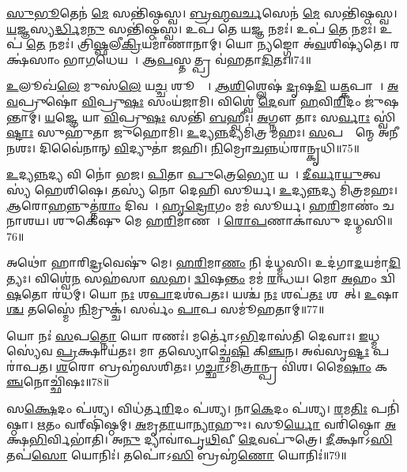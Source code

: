 \ul{𑌸𑍁}\ul{𑌭𑍂}𑌤𑍇𑌨॑ \ul{𑌮𑍇} 𑌸𑌨𑍍𑌤𑌿॑𑌷𑍍𑌠𑌸𑍍𑌵।
\ul{𑌬𑍍𑌰}\ul{𑌹𑍍𑌮}\ul{𑌵}\ul{𑌰𑍍𑌚}𑌸𑍇𑌨॑ \ul{𑌮𑍇} 𑌸𑌨𑍍𑌤𑌿॑𑌷𑍍𑌠𑌸𑍍𑌵।
\ul{𑌯}𑌜𑍍𑌞𑌸𑍍𑌯\ul{𑌰𑍍𑌦𑍍𑌧𑌿}𑌮\ul{𑌨𑍁} 𑌸𑌨𑍍𑌤𑌿॑𑌷𑍍𑌠𑌸𑍍𑌵।
𑌉𑌪॑ 𑌤𑍇 𑌯\ul{𑌜𑍍𑌞} 𑌨𑌮𑌃॑।
𑌉𑌪॑ \ul{𑌤𑍇} 𑌨𑌮𑌃॑।
𑌉𑌪॑ \ul{𑌤𑍇} 𑌨𑌮𑌃॑।
𑌤𑍍𑌰𑌿\ul{𑌷𑍍𑌫}𑌲𑍀\ul{𑌕𑍍𑌰𑌿}𑌯𑌮𑌾॑𑌣𑌾𑌨𑌾𑌮𑍍।
𑌯𑍋 \ul{𑌨𑍍𑌯}𑌙𑍍𑌗𑍋 𑌅॑\ul{𑌵}𑌶𑌿𑌷𑍍𑌯॑𑌤𑍇।
𑌰𑌕𑍍𑌷॑𑌸𑌾𑌂 𑌭𑌾\ul{𑌗}𑌧𑍇𑌯𑌮𑍍᳚।
𑌆\ul{𑌪}𑌸𑍍𑌤𑌤𑍍𑌪𑍍𑌰 𑌵॑𑌹𑌤𑌾\ul{𑌦𑌿}𑌤𑌃॥74॥

\ul{𑌉}𑌲𑍂𑌖॑\ul{𑌲𑍇} 𑌮𑍁𑌸॑\ul{𑌲𑍇} 𑌯\ul{𑌚𑍍𑌚} 𑌶𑍂𑌰𑍍𑌪𑍇᳚।
\ul{𑌆}\ul{𑌶𑌿}𑌶𑍍𑌲𑍇𑌷॑ \ul{𑌦𑍃}𑌷\ul{𑌦𑌿} 𑌯\ul{𑌤𑍍𑌕}𑌪𑌾𑌲𑍇᳚।
\ul{𑌅}\ul{𑌵}𑌪𑍍𑌰𑍁𑌷𑍋॑ \ul{𑌵𑌿}𑌪𑍍𑌰𑍁\ul{𑌷𑌃} 𑌸𑌂𑌯॑𑌜𑌾𑌮𑌿।
𑌵𑌿𑌶𑍍𑌵𑍇॑ \ul{𑌦𑍇}𑌵𑌾 \ul{𑌹}𑌵𑌿\ul{𑌰𑌿}𑌦𑌂 𑌜𑍁॑𑌷𑌨𑍍𑌤𑌾𑌮𑍍।
\ul{𑌯}𑌜𑍍𑌞𑍇 𑌯𑌾 \ul{𑌵𑌿}𑌪𑍍𑌰𑍁\ul{𑌷𑌃} 𑌸𑌨𑍍𑌤𑌿॑ \ul{𑌬}𑌹𑍍𑌵𑍀𑌃।
\ul{𑌅}𑌗𑍍𑌨𑍗 𑌤𑌾𑌃 𑌸\ul{𑌰𑍍𑌵𑌾𑌃} 𑌸𑍍𑌵𑌿॑\ul{𑌷𑍍𑌟𑌾𑌃} 𑌸𑍁𑌹𑍁॑𑌤𑌾 𑌜𑍁𑌹𑍋𑌮𑌿।
\ul{𑌉}𑌦𑍍𑌯\ul{𑌨𑍍𑌨}𑌦𑍍𑌯𑌮𑌿॑𑌤𑍍𑌰 𑌮𑌹𑌃।
\ul{𑌸}𑌪𑌤𑍍𑌨𑌾᳚𑌨𑍍𑌮𑍇 𑌅𑌨𑍀𑌨𑌶𑌃।
𑌦𑌿𑌵𑍈॑𑌨𑌾𑌨𑍍 \ul{𑌵𑌿}𑌦𑍍𑌯𑍁𑌤𑌾॑ 𑌜𑌹𑌿।
\ul{𑌨𑌿}𑌮𑍍𑌰𑍋\ul{𑌚}𑌨𑍍𑌨𑌧॑𑌰𑌾𑌨𑍍𑌕𑍃𑌧𑌿॥75॥

\ul{𑌉}𑌦𑍍𑌯\ul{𑌨𑍍𑌨}𑌦𑍍𑌯 𑌵𑌿 𑌨𑍋॑ 𑌭𑌜।
\ul{𑌪𑌿}𑌤𑌾 \ul{𑌪𑍁}𑌤𑍍𑌰𑍇\ul{𑌭𑍍𑌯𑍋} 𑌯𑌥𑌾᳚।
\ul{𑌦𑍀}\ul{𑌰𑍍𑌘𑌾}\ul{𑌯𑍁}𑌤𑍍𑌵𑌸𑍍𑌯॑ 𑌹𑍇𑌶𑌿𑌷𑍇।
𑌤𑌸𑍍𑌯॑ 𑌨𑍋 𑌦𑍇𑌹𑌿 𑌸𑍂𑌰𑍍𑌯।
\ul{𑌉}𑌦𑍍𑌯\ul{𑌨𑍍𑌨}𑌦𑍍𑌯 𑌮𑌿॑𑌤𑍍𑌰𑌮𑌹𑌃।
\ul{𑌆}𑌰𑍋\ul{𑌹}𑌨𑍍𑌨𑍁𑌤𑍍𑌤॑\ul{𑌰𑌾𑌂} 𑌦𑌿𑌵𑌮𑍍᳚।
\ul{𑌹𑍃}\ul{𑌦𑍍𑌰𑍋}𑌗𑌂 𑌮𑌮॑ 𑌸𑍂𑌰𑍍𑌯।
\ul{𑌹}\ul{𑌰𑌿}𑌮𑌾𑌣𑌂॑ 𑌚 𑌨𑌾𑌶𑌯।
𑌶𑍁𑌕𑍇॑𑌷𑍁 𑌮𑍇 𑌹\ul{𑌰𑌿}𑌮𑌾𑌣𑌮𑍍᳚।
\ul{𑌰𑍋}\ul{𑌪}𑌣𑌾𑌕𑌾॑𑌸𑍁 𑌦𑌧𑍍𑌮𑌸𑌿॥76॥

𑌅𑌥𑍋॑ 𑌹𑌾𑌰𑌿\ul{𑌦𑍍𑌰}𑌵𑍇𑌷𑍁॑ 𑌮𑍇।
\ul{𑌹}\ul{𑌰𑌿}𑌮𑌾\ul{𑌣𑌂} 𑌨𑌿 𑌦॑𑌧𑍍𑌮𑌸𑌿।
𑌉𑌦॑𑌗𑌾\ul{𑌦}𑌯𑌮𑌾॑\ul{𑌦𑌿}𑌤𑍍𑌯𑌃।
𑌵𑌿𑌶𑍍𑌵𑍇॑\ul{𑌨} 𑌸𑌹॑𑌸𑌾 \ul{𑌸}𑌹।
\ul{𑌦𑍍𑌵𑌿}𑌷\ul{𑌨𑍍𑌤𑌂} 𑌮𑌮॑ \ul{𑌰}𑌨𑍍𑌧𑌯\sn{}।
𑌮𑍋 \ul{𑌅}𑌹𑌂 𑌦𑍍𑌵𑌿॑\ul{𑌷}𑌤𑍋 𑌰॑𑌧𑌮𑍍।
𑌯𑍋 \ul{𑌨𑌃} 𑌶\ul{𑌪𑌾}𑌦𑌶॑𑌪𑌤𑌃।
𑌯𑌶𑍍𑌚॑ \ul{𑌨𑌃} 𑌶𑌪॑\ul{𑌤𑌃} 𑌶𑌪𑌾᳚𑌤𑍍।
\ul{𑌉}𑌷𑌾\ul{𑌶𑍍𑌚} 𑌤𑌸𑍍𑌮𑍈॑ \ul{𑌨𑌿}𑌮𑍍𑌰𑍁𑌕𑍍𑌚॑।
𑌸𑌰𑍍𑌵𑌂॑ \ul{𑌪𑌾}𑌪 𑌸𑌮𑍂॑𑌹𑌤𑌾𑌮𑍍॥77॥

𑌯𑍋 𑌨𑌃॑ \ul{𑌸}𑌪\ul{𑌤𑍍𑌨𑍋} 𑌯𑍋 𑌰𑌣𑌃॑।
𑌮𑌰𑍍𑌤𑍋॑\-𑌽\ul{𑌭𑌿}𑌦𑌾𑌸॑𑌤𑌿 𑌦𑍇𑌵𑌾𑌃।
\ul{𑌇}𑌧𑍍𑌮𑌸𑍍𑌯𑍇॑𑌵 \ul{𑌪𑍍𑌰}𑌕𑍍𑌷𑌾𑌯॑𑌤𑌃।
𑌮𑌾 𑌤𑌸𑍍𑌯𑍋𑌚𑍍𑌛𑍇॑\ul{𑌷𑌿} 𑌕𑌿\ul{𑌞𑍍𑌚}𑌨।
𑌅𑌵॑𑌸𑍃\ul{𑌷𑍍𑌟𑌃} 𑌪𑌰𑌾॑𑌪𑌤।
\ul{𑌶}𑌰𑍋 𑌬𑍍𑌰𑌹𑍍𑌮॑𑌸𑌶𑌿𑌤𑌃।
𑌗\ul{𑌚𑍍𑌛𑌾}\-𑌽𑌮𑌿\ul{𑌤𑍍𑌰𑌾}𑌨𑍍𑌪𑍍𑌰 𑌵𑌿॑𑌶।
𑌮𑍈\ul{𑌷𑌾𑌂} 𑌕\ul{𑌞𑍍𑌚}𑌨𑍋𑌚𑍍𑌛𑌿॑𑌷𑌃॥78॥

𑌸\ul{𑌕𑍍𑌷𑍇}𑌦𑌂 𑌪॑𑌶𑍍𑌯।
𑌵𑌿𑌧॑𑌰𑍍𑌤\ul{𑌰𑌿}𑌦𑌂 𑌪॑𑌶𑍍𑌯।
𑌨𑌾\ul{𑌕𑍇}𑌦𑌂 𑌪॑𑌶𑍍𑌯।
\ul{𑌰}𑌮\ul{𑌤𑌿𑌃} 𑌪𑌨𑌿॑𑌷𑍍𑌠𑌾।
\ul{𑌋}𑌤𑌂 𑌵𑌰𑍍‌\mbox{}𑌷𑌿॑𑌷𑍍𑌠𑌮𑍍।
\ul{𑌅}𑌮𑍃\ul{𑌤𑌾}𑌯𑌾\ul{𑌨𑍍𑌯𑌾}𑌹𑍁𑌃।
𑌸𑍂\ul{𑌰𑍍𑌯𑍋} 𑌵𑌰𑌿॑𑌷𑍍𑌠𑍋 \ul{𑌅}𑌕𑍍𑌷\ul{𑌭𑌿}𑌰𑍍𑌵𑌿𑌭𑌾॑𑌤𑌿।
𑌅\ul{𑌨𑍁} 𑌦𑍍𑌯𑌾𑌵𑌾॑𑌪𑍃\ul{𑌥𑌿}𑌵𑍀 \ul{𑌦𑍇}𑌵𑌪𑍁॑𑌤𑍍𑌰𑍇।
\ul{𑌦𑍀}𑌕𑍍𑌷𑌾𑌽\ul{𑌸𑌿} 𑌤𑌪॑\ul{𑌸𑍋} 𑌯𑍋𑌨𑌿𑌃॑।
𑌤𑌪𑍋॑𑌽\ul{𑌸𑌿} 𑌬𑍍𑌰𑌹𑍍𑌮॑\ul{𑌣𑍋} 𑌯𑍋𑌨𑌿𑌃॑॥79॥

